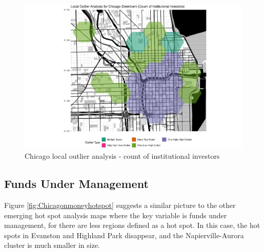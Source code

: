 \begin{figure}
	\centering
	\includegraphics[width=1\linewidth]{Figures/ChapterIV/Chi_Count_LO_Downtown}
	\caption[Downtown Chicago Local Outlier Analysis - Count of Institutional Investors 1999-2018]{Chicago local outlier analysis - count of institutional investors}
	\label{fig:Chicagocountlocaloutliercount_Downtown}
\end{figure}	

\subsection{Funds Under Management}

Figure \ref{fig:Chicagonmoneyhotspot} suggests a similar picture to the other emerging hot spot analysis maps where the key variable is funds under management, for there are less regions defined as a hot spot.  In this case, the hot spots in Evanston and Highland Park disappear, and the Napierville-Aurora cluster is much smaller in size.    

